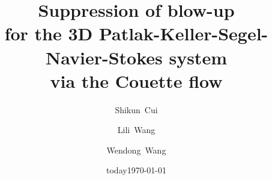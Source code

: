 \documentclass[12pt, reqno]{amsart}
\date{today}
\numberwithin{equation}{section}
\begin{document}
\title[\vspace{-0.2cm}Suppression of blow-up for PKS-NS system]{Suppression of blow-up \\for the 3D Patlak-Keller-Segel-Navier-Stokes system \\via the Couette flow}
\author{Shikun~Cui}
\address[Shikun~Cui]{School of Mathematical Sciences, Dalian University of Technology, Dalian, 116024,  China}
\author{Lili~Wang}
\address[Lili~Wang]{School of Mathematical Sciences, Dalian University of Technology, Dalian, 116024,  China}
\author{Wendong~Wang}
\address[Wendong~Wang]{School of Mathematical Sciences, Dalian University of Technology, Dalian, 116024,  China}
\date{\today}

\vspace*{-0.6cm}
\maketitle
\end{document}
